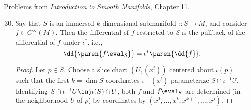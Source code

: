 \documentclass[onesided]{ccg-pset}
\author{Colton Grainger}
\date{\today}
\begin{document}
\maketitle

Problems from \emph{Introduction to Smooth Manifolds}, Chapter 11.
\setcounter{section}{11}

\begin{enumerate}

\setcounter{enumi}{29}
\item Say that $S$ is an immersed $k$-dimensional submanifold $\iota \colon S \to M$, and consider $f \in C^\infty(M)$. 
    Then the differential of $f$ restricted to $S$ is the pullback of the differential of $f$ under $\iota^*$, i.e., 
    \begin{equation}
        \label{1130}
        \dd{\paren{f\eval_S}} = \iota^*\paren{\dd{f}}.
    \end{equation}

    \begin{proof}
        Let $p \in S$. 
        Choose a slice chart $(U, (x^i))$ centered about $\iota(p)$ such that the first $k = \dim S$ coordinates $\iota^{-1} (x^i)$ parameterize $S \cap \iota^{-1}U$. 
        Identifying $S \cap \iota^{-1}U \inj \iota(S) \cap U$,
        both $f$ and $f \eval_S$ are determined (in the neighborhood $U$ of $p$) by coordinates by $(x^1, \ldots, x^k, x^{k+1}, \ldots, x^j)$.


\end{proof}
\end{enumerate}
\end{document}
